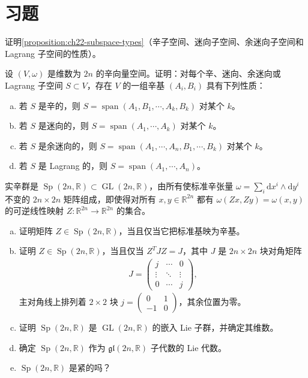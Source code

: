 \documentclass[../../main.tex]{subfiles}
\begin{document}
\section{习题}\label{section:ch22-problems}

\begin{exercise}\label{exercise:ch22-p22-01}
证明\cref{proposition:ch22-subspace-types}（辛子空间、迷向子空间、余迷向子空间和 Lagrang 子空间的性质）。
\end{exercise}

\begin{exercise}\label{exercise:ch22-p22-02}
设 $(V,\omega)$ 是维数为 $2n$ 的辛向量空间。证明：对每个辛、迷向、余迷向或 Lagrang 子空间 $S\subset V$，存在 $V$ 的一组辛基 $(A_i,B_i)$ 具有下列性质：
\begin{enumerate}[(a)]
\item 若 $S$ 是辛的，则 $S=\operatorname{span}(A_1,B_1,\cdots ,A_k,B_k)$ 对某个 $k$。
\item 若 $S$ 是迷向的，则 $S=\operatorname{span}(A_1,\cdots ,A_k)$ 对某个 $k$。
\item 若 $S$ 是余迷向的，则 $S=\operatorname{span}(A_1,\cdots ,A_n,B_1,\cdots ,B_k)$ 对某个 $k$。
\item 若 $S$ 是 Lagrang 的，则 $S=\operatorname{span}(A_1,\cdots ,A_n)$。
\end{enumerate}
\end{exercise}

\begin{exercise}\label{exercise:ch22-p22-03}
实辛群是 $\operatorname{Sp}(2n,\mathbb R)\subset\operatorname{GL}(2n,\mathbb R)$，由所有使标准辛张量 $\omega=\sum_i\mathrm{d}x^i\wedge\mathrm{d}y^i$ 不变的 $2n\times2n$ 矩阵组成，即使得对所有 $x,y\in\mathbb{R}^{2n}$ 都有 $\omega(Zx,Zy)=\omega(x,y)$ 的可逆线性映射 $Z:\mathbb{R}^{2n}\to\mathbb{R}^{2n}$ 的集合。
\begin{enumerate}[(a)]
\item 证明矩阵 $Z\in\operatorname{Sp}(2n,\mathbb R)$，当且仅当它把标准基映为辛基。
\item 证明 $Z\in\operatorname{Sp}(2n,\mathbb R)$，当且仅当 $Z^TJZ=J$，其中 $J$ 是 $2n\times2n$ 块对角矩阵
\begin{align*}
J=\begin{pmatrix}j&\cdots&0\\\vdots&\ddots&\vdots\\0&\cdots&j\end{pmatrix},
\end{align*}
主对角线上排列着 $2\times2$ 块 $j=\begin{pmatrix}0&1\\-1&0\end{pmatrix}$，其余位置为零。
\item 证明 $\operatorname{Sp}(2n,\mathbb R)$ 是 $\operatorname{GL}(2n,\mathbb R)$ 的嵌入 Lie 子群，并确定其维数。
\item 确定 $\operatorname{Sp}(2n,\mathbb R)$ 作为 $\mathfrak{gl}(2n,\mathbb R)$ 子代数的 Lie 代数。
\item $\operatorname{Sp}(2n,\mathbb R)$ 是紧的吗？
\end{enumerate}
\end{exercise}
\end{document}
